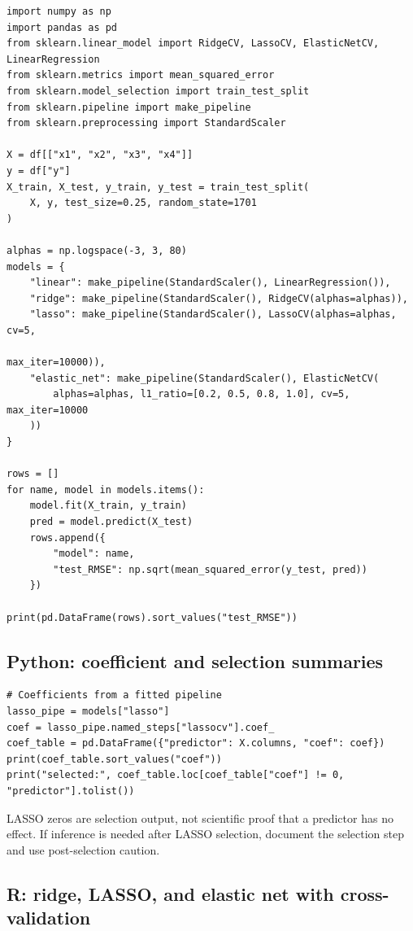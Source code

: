 \begin{verbatim}
import numpy as np
import pandas as pd
from sklearn.linear_model import RidgeCV, LassoCV, ElasticNetCV, LinearRegression
from sklearn.metrics import mean_squared_error
from sklearn.model_selection import train_test_split
from sklearn.pipeline import make_pipeline
from sklearn.preprocessing import StandardScaler

X = df[["x1", "x2", "x3", "x4"]]
y = df["y"]
X_train, X_test, y_train, y_test = train_test_split(
    X, y, test_size=0.25, random_state=1701
)

alphas = np.logspace(-3, 3, 80)
models = {
    "linear": make_pipeline(StandardScaler(), LinearRegression()),
    "ridge": make_pipeline(StandardScaler(), RidgeCV(alphas=alphas)),
    "lasso": make_pipeline(StandardScaler(), LassoCV(alphas=alphas, cv=5,
                                                       max_iter=10000)),
    "elastic_net": make_pipeline(StandardScaler(), ElasticNetCV(
        alphas=alphas, l1_ratio=[0.2, 0.5, 0.8, 1.0], cv=5, max_iter=10000
    ))
}

rows = []
for name, model in models.items():
    model.fit(X_train, y_train)
    pred = model.predict(X_test)
    rows.append({
        "model": name,
        "test_RMSE": np.sqrt(mean_squared_error(y_test, pred))
    })

print(pd.DataFrame(rows).sort_values("test_RMSE"))
\end{verbatim}

\subsection*{Python: coefficient and selection summaries}

\begin{verbatim}
# Coefficients from a fitted pipeline
lasso_pipe = models["lasso"]
coef = lasso_pipe.named_steps["lassocv"].coef_
coef_table = pd.DataFrame({"predictor": X.columns, "coef": coef})
print(coef_table.sort_values("coef"))
print("selected:", coef_table.loc[coef_table["coef"] != 0, "predictor"].tolist())
\end{verbatim}

LASSO zeros are selection output, not scientific proof that a predictor has no effect.  If inference is needed after LASSO selection, document the selection step and use post-selection caution.

\subsection*{R: ridge, LASSO, and elastic net with cross-validation}

